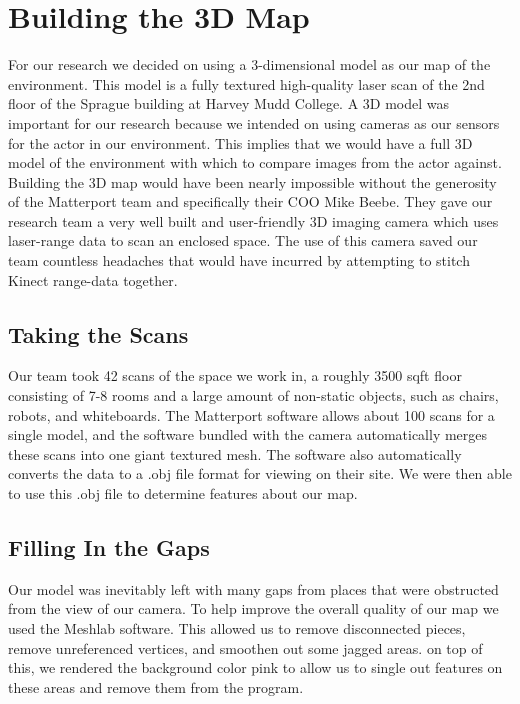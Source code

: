 \documentclass[a4paper,11pt]{article}
\begin{document}
  \newpage




  \section{Building the 3D Map}
  For our research we decided on using a 3-dimensional model as our map of the environment. This model is a fully textured high-quality laser scan of the 2nd floor of the Sprague building at Harvey Mudd College. A 3D model was important for our research because we intended on using cameras as our sensors for the actor in our environment. This implies that we would have a full 3D model of the environment with which to compare  images from the actor against.  Building the 3D map would have been nearly impossible without the generosity of the Matterport team and specifically their COO Mike Beebe. They gave our research team a very well built and user-friendly 3D imaging camera which uses laser-range data to scan an enclosed space. The use of this camera saved our team countless headaches that would have incurred by attempting to stitch Kinect range-data together.
  
  \subsection{Taking the Scans}
 Our team took 42 scans of the space we work in, a roughly 3500 sqft floor consisting of 7-8 rooms and a large amount of non-static objects, such as chairs, robots, and whiteboards. The Matterport software allows about 100 scans for a single model, and the software bundled with the camera automatically merges these scans into one giant textured mesh. The software also automatically converts the data to a .obj file format for viewing on their site. We were then able to use this .obj file to determine features about our map.


  \subsection{Filling In the Gaps}
  Our model was inevitably left with many gaps from places that were obstructed from the view of our camera. To help improve the overall quality of our map we used the Meshlab software. This allowed us to remove disconnected pieces, remove unreferenced vertices, and smoothen out some jagged areas. on top of this, we rendered the background color pink to allow us to single out features on these areas and remove them from the program.
  
\end{document}

